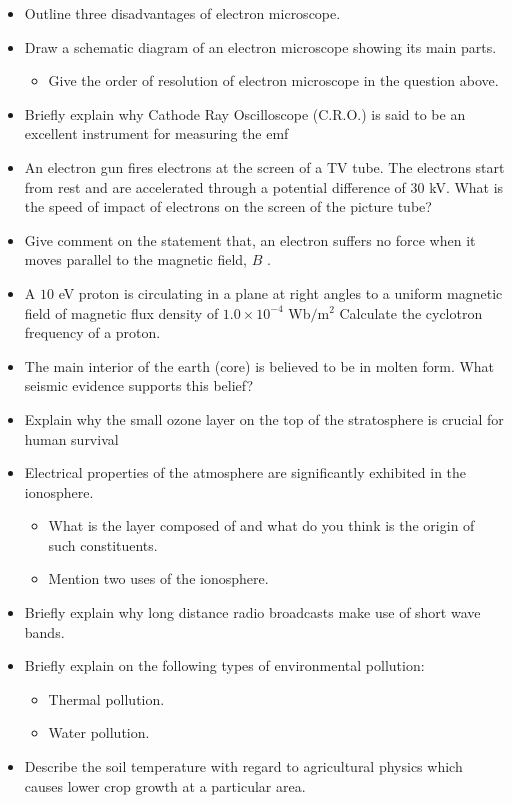\documentclass{article}
\begin{document}
\begin{itemize}
\item Outline three disadvantages of electron microscope.
\item Draw a schematic diagram of an electron microscope showing its main parts.
 \begin{itemize}
\item Give the order of resolution of electron microscope in the question above.
\end{itemize}
\item Briefly explain why Cathode Ray Oscilloscope (C.R.O.) is said to be an excellent instrument for measuring the emf 
\item An electron gun fires electrons at the screen of a TV tube. The electrons start from rest and are accelerated through a potential difference of $ 30$ kV. What is the speed of impact of electrons on the screen of the picture tube?
\item Give comment on the statement that, an electron suffers no force when it moves parallel to the magnetic field, $ B$ .
\item A $ 10$ eV proton is circulating in a plane at right angles to a uniform magnetic field of magnetic flux density of $ 1.0 \times 10^{-4}$ Wb$/$m$ ^{2}$ Calculate the cyclotron frequency of a proton.
\item The main interior of the earth (core) is believed to be in molten form. What seismic evidence supports this belief?
\item Explain why the small ozone layer on the top of the stratosphere is crucial for human survival
\item Electrical properties of the atmosphere are significantly exhibited in the ionosphere.
 \begin{itemize}
\item  What is the layer composed of and what do you think is the origin of such constituents.
\item  Mention two uses of the ionosphere.
\end{itemize}
\item Briefly explain why long distance radio broadcasts make use of short wave bands.
\item Briefly explain on the following types of environmental pollution:
 \begin{itemize}
\item  Thermal pollution.
\item  Water pollution.
\end{itemize}
\item Describe the soil temperature with regard to agricultural physics which causes lower crop growth at a particular area.
\end{itemize}
\end{document}
